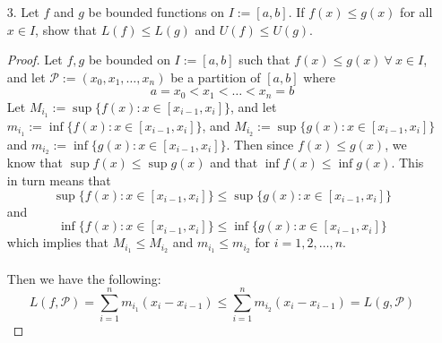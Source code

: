 \documentclass[12pt,letterpaper]{article}
\theoremstyle{case}
\theoremstyle{definition}
\begin{document}
\begin{enumerate}
\begin{enumerate}
\begin{proof}
\begin{align*}
					&= c (x_n-x_0) \\
					&= c(b-a), &\text{as both $b$ and $a$ were defined for $\mathcal{P}$}
				\end{align*}
				and thus $L(f,\mathcal{P}) = c(b-a)$.
				\\\\Now we must find the Darboux integral of $f(x)$. So we have that the upper Darboux integral of $f(x)$ is 
				\begin{align*}
					U(f) &= \inf \{U(f,\mathcal{P}): \mathcal{P} \in \mathscr{P}[a,b]\} \\
					&= \inf \{c(b-a): \mathcal{P} \in \mathscr{P}[a,b]\} \\
					&= c(b-a)
				\end{align*}
				and the lower Darboux integral is
				\begin{align*}
					L(f) &= \sup \{L(f, \mathcal{P}): \mathcal{P} \in \mathscr{P}[a,b]\} \\
					&= \sup \{c(b-a) : \mathcal{P} \in \mathscr{P}[a,b]\} \\
					&= c(b-a)
				\end{align*}
				Thus we have that $U(f)=L(f)$, which yields that $f$ is Darboux integrable on $[a,b]$ and the Darboux integral of $f$ is $c(b-a)$.
			\end{proof}
			\item[3.] Let $f$ and $g$ be bounded functions on $I:=[a,b]$. If $f(x) \leq g(x)$ for all $x \in I$, show that $L(f) \leq L(g)$ and $U(f) \leq U(g)$.
			\begin{proof}
				Let $f,g$ be bounded on $I:=[a,b]$ such that $f(x) \leq g(x)\ \forall\ x \in I$, and let $\mathcal{P}:=(x_0,x_1,\dots, x_n)$ be a partition of $[a,b]$ where
				\[a=x_0<x_1<\dots<x_n=b\]
				Let $M_{i_1}:=\sup \{f(x): x \in [x_{i-1},x_i]\}$, and let $m_{i_1}:=\inf \{f(x): x \in [x_{i-1},x_i]\}$, and $M_{i_2} := \sup \{g(x): x \in [x_{i-1},x_i]\}$ and $m_{i_2}:=\inf\{g(x):x\in[x_{i-1},x_i]\}$. Then since $f(x) \leq g(x)$, we know that $\sup f(x) \leq \sup g(x)$ and that $\inf f(x) \leq \inf g(x)$. This in turn means that
				\[\sup \{f(x): x \in [x_{i-1},x_i]\} \leq \sup \{g(x): x \in [x_{i-1},x_i]\}\]
				and
				\[\inf \{f(x): x \in [x_{i-1},x_i]\} \leq \inf \{g(x): x \in [x_{i-1},x_i]\}\]
				which implies that $M_{i_1} \leq M_{i_2}$ and $m_{i_1} \leq m_{i_2}$ for $i=1,2, \dots, n$.
				\\\\Then we have the following:
				\[L(f,\mathcal{P}) = \sum_{i=1}^{n} m_{i_1} (x_i-x_{i-1}) \leq \sum_{i=1}^{n} m_{i_2} (x_i-x_{i-1})= L(g,\mathcal{P})\]

\end{proof}
\end{enumerate}
\end{enumerate}
\end{document}
